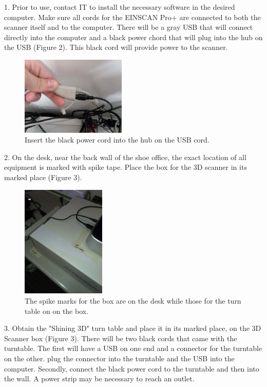 1.	Prior to use, contact IT to install the necessary software in the desired computer. Make sure all cords for the EINSCAN Pro+ are connected to both the scanner itself and to the computer. There will be a gray USB that will connect directly into the computer and a black power chord that will plug into the hub on the USB (Figure 2). This black cord will provide power to the scanner. 

\begin{figure}[!htp]
\centering
\includegraphics[width=5cm]{Plug}
\caption{Insert the black power cord into the hub on the USB cord.}
\label{Image 2}
\end{figure}

\newpage

2. On the desk, near the back wall of the shoe office, the exact location of all equipment is marked with spike tape. Place the box for the 3D scanner in its marked place (Figure 3). 

\begin{figure}[!htp]
\centering
\includegraphics[width=4cm]{Spike_Turn_Table}
\caption{The spike marks for the box are on the desk while those for the turn table on on the box.}
\label{Image 3}
\end{figure}


3. Obtain the "Shining 3D" turn table and place it in its marked place, on the 3D Scanner box (Figure 3). There will be two black cords that came with the turntable. The first will have a USB on one end and a connector for the turntable on the other. plug the connector into the turntable and the USB into the computer. Secondly, connect the black power cord to the turntable and then into the wall. A power strip may be necessary to reach an outlet. 

